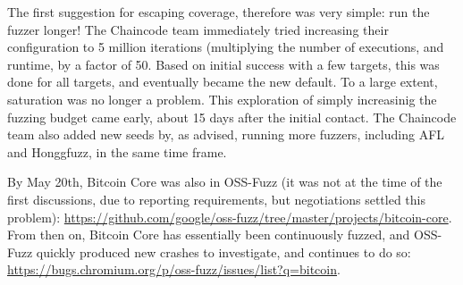 The first suggestion for escaping coverage, therefore was very simple:  run the fuzzer longer!  The Chaincode team immediately tried increasing their configuration to 5 million iterations (multiplying the number of executions, and runtime, by a factor of 50.  Based on initial success with a few targets, this was done for all targets, and eventually became the new default.  To a large extent, saturation was  no longer a problem.  This exploration of simply increasinig the fuzzing budget came early, about 15 days after the initial contact.  The Chaincode team also added new seeds by, as advised, running more fuzzers, including AFL and Honggfuzz, in the same time frame.

By May 20th, Bitcoin Core was also in OSS-Fuzz (it was not at the time of the first discussions, due to reporting requirements, but negotiations settled this problem): \url{https://github.com/google/oss-fuzz/tree/master/projects/bitcoin-core}.  From then on, Bitcoin Core has essentially been continuously fuzzed, and OSS-Fuzz quickly produced new crashes to investigate, and continues to do so:  \url{https://bugs.chromium.org/p/oss-fuzz/issues/list?q=bitcoin}.